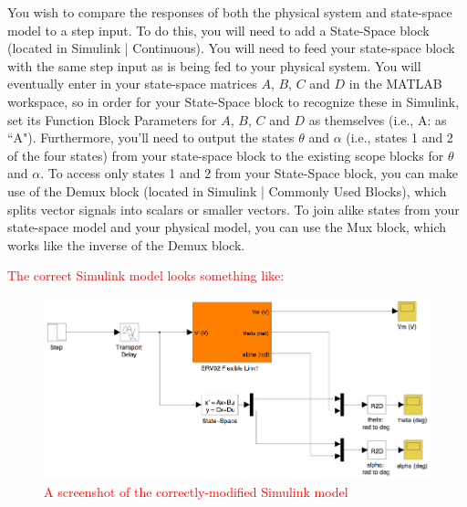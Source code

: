 \documentclass[12pt]{report}
\newcommand\drew[1]{\textcolor{red}{#1}}
\begin{document}
You wish to compare the responses of both the physical system and state-space model to a step input. To do this, you will need to add a State-Space block (located in Simulink | Continuous). You will need to feed your state-space block with the same step input as is being fed to your physical system. You will eventually enter in your state-space matrices $A$, $B$, $C$ and $D$ in the MATLAB workspace, so in order for your State-Space block to recognize these in Simulink, set its Function Block Parameters for $A$, $B$, $C$ and $D$ as themselves (i.e., A: as ``A"). Furthermore, you'll need to output the states $\theta$ and $\alpha$ (i.e., states 1 and 2 of the four states) from your state-space block to the existing scope blocks for $\theta$ and $\alpha$. To access only states 1 and 2 from your State-Space block, you can make use of the Demux block (located in Simulink | Commonly Used Blocks), which splits vector signals into scalars or smaller vectors. To join alike states from your state-space model and your physical model, you can use the Mux block, which works like the inverse of the Demux block.\\
\drew{The correct Simulink model looks something like:
    \begin{figure}[htb!]
        \centering
        \includegraphics[width=.6\linewidth]{eps/lab_1/model_validation.eps}
        \caption{A screenshot of the correctly-modified Simulink model}
        \label{fig:lab1_model_validation}
    \end{figure}
}
\end{document}
